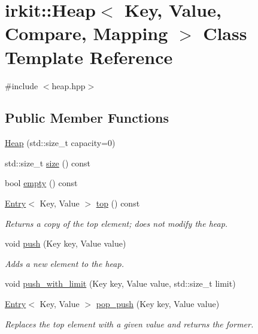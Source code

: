 \hypertarget{classirkit_1_1Heap}{}\section{irkit\+:\+:Heap$<$ Key, Value, Compare, Mapping $>$ Class Template Reference}
\label{classirkit_1_1Heap}


{\ttfamily \#include $<$heap.\+hpp$>$}

\subsection*{Public Member Functions}
\begin{DoxyCompactItemize}
\item 
\mbox{\hyperlink{classirkit_1_1Heap_ac262b1efe6564321f3f8476dc8665eaf}{Heap}} (std\+::size\+\_\+t capacity=0)
\item 
std\+::size\+\_\+t \mbox{\hyperlink{classirkit_1_1Heap_acc53589d12325834624aa08573139227}{size}} () const
\item 
bool \mbox{\hyperlink{classirkit_1_1Heap_abb96822afb46391c107efef35e79256b}{empty}} () const
\item 
\mbox{\hyperlink{structirkit_1_1Entry}{Entry}}$<$ Key, Value $>$ \mbox{\hyperlink{classirkit_1_1Heap_aa14c398611006aa94e2fe24be3cf34ec}{top}} () const
\begin{DoxyCompactList}\small\item\em Returns a copy of the top element; does not modify the heap. \end{DoxyCompactList}\item 
void \mbox{\hyperlink{classirkit_1_1Heap_a8e2dfbd02e7411fe97281b5e7d19f12c}{push}} (Key key, Value value)
\begin{DoxyCompactList}\small\item\em Adds a new element to the heap. \end{DoxyCompactList}\item 
void \mbox{\hyperlink{classirkit_1_1Heap_ae4652d2601229e4de97f0321adf5f3c6}{push\+\_\+with\+\_\+limit}} (Key key, Value value, std\+::size\+\_\+t limit)
\item 
\mbox{\hyperlink{structirkit_1_1Entry}{Entry}}$<$ Key, Value $>$ \mbox{\hyperlink{classirkit_1_1Heap_aa94f791b5b26659cc41a39fd58d138e4}{pop\+\_\+push}} (Key key, Value value)
\begin{DoxyCompactList}\small\item\em Replaces the top element with a given value and returns the former. \end{DoxyCompactList}\item 

\end{DoxyCompactItemize}
